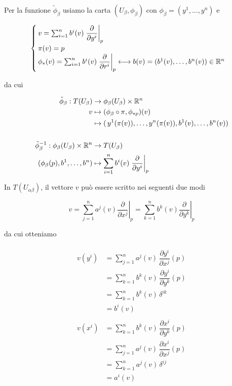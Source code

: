 Per la funzione $ \tilde{\phi}_{\beta} $ usiamo la carta $ (U_{\beta},\phi_{\beta}) $ con $ \phi_{\beta} = (y^{1},\dots,y^{n}) $ e

\begin{equation}
	\begin{cases}
		v = \sum_{i=1}^{n} b^{i}(v) \left. \dfrac{\partial}{\partial y^{i}} \right|_{p}\\
		\pi(v) = p\\
		\phi_{*}(v) = \sum_{i=1}^{n} b^{i}(v) \left. \dfrac{\partial}{\partial r^{i}} \right|_{p} \longleftrightarrow b(v) = (b^{1}(v),\dots,b^{n}(v)) \in \mathbb{R}^{n}
	\end{cases}	
\end{equation}

da cui

\begin{align}
	\begin{split}
		\tilde{\phi}_{\beta} : T(U_{\beta}) &\to \phi_{\beta}(U_{\beta}) \times \mathbb{R}^{n}\\
		v &\mapsto (\phi_{\beta} \circ \pi, \phi_{*p})(v)\\
		&\mapsto ( \, y^{1}(\pi(v)),\dots,y^{n}(\pi(v)), b^{1}(v),\dots,b^{n}(v))\\\\
		\tilde{\phi}_{\beta}^{-1} : \phi_{\beta}(U_{\beta}) \times \mathbb{R}^{n} &\to T(U_{\beta})\\
		(\phi_{\beta}(p), b^{1},\dots,b^{n}) &\mapsto \sum_{i=1}^{n} b^{i}(v) \left. \dfrac{\partial}{\partial y^{i}} \right|_{p}
	\end{split}
\end{align}

In $ T(U_{\alpha \beta}) $, il vettore $ v $ può essere scritto nei seguenti due modi

\begin{equation}
	v = \sum_{j=1}^{n} a^{j}(v) \left. \dfrac{\partial}{\partial x^{j}} \right|_{p} = \sum_{k=1}^{n} b^{k}(v) \left. \dfrac{\partial}{\partial y^{k}} \right|_{p}
\end{equation}

da cui otteniamo

\begin{align}
	\begin{split}
		v(y^{i}) &= \sum_{j=1}^{n} a^{j}(v) \, \dfrac{\partial y^{i}}{\partial x^{j}} (p)\\
		&= \sum_{k=1}^{n} b^{k}(v) \, \dfrac{\partial y^{i}}{\partial y^{k}} (p)\\
		&= \sum_{k=1}^{n} b^{k}(v) \, \delta^{ik}\\
		&= b^{i}(v)\\\\
		v(x^{i}) &= \sum_{k=1}^{n} b^{k}(v) \, \dfrac{\partial x^{i}}{\partial y^{k}} (p)\\
		&= \sum_{j=1}^{n} a^{j}(v) \, \dfrac{\partial x^{i}}{\partial x^{j}} (p)\\
		&= \sum_{k=1}^{n} a^{j}(v) \, \delta^{ij}\\
		&= a^{i}(v)
	\end{split}
\end{align}

